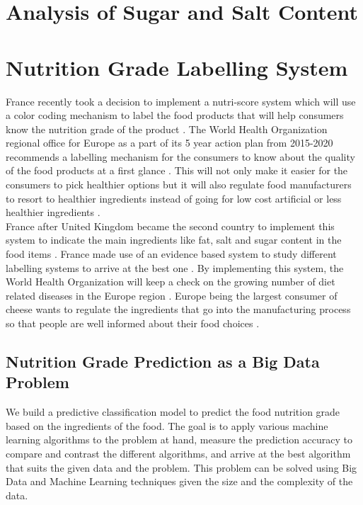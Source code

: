 \documentclass[sigconf]{acmart}
\begin{document}
\section{Analysis of Sugar and Salt Content}

\section{Nutrition Grade Labelling System}
France recently took a decision to implement a nutri-score system which will use a color coding mechanism to label the food products that will help consumers know the nutrition grade of the product \cite{www-who}. The World Health Organization regional office for Europe as a part of its 5 year action plan from 2015-2020 recommends a labelling mechanism for the consumers to know about the quality of the food products at a first glance \cite{www-who}. This will not only make it easier for the consumers to pick healthier options but it will also regulate food manufacturers to resort to healthier ingredients instead of going for low cost artificial or less healthier ingredients \cite{www-who}.  \\

France after United Kingdom became the second country to implement this system to indicate the main ingredients like fat, salt and sugar content in the food items \cite{www-who}. France made use of an evidence based system to study different labelling systems to arrive at the best one \cite{www-who}. By implementing this system, the World Health Organization will keep a check on the growing number of diet related diseases in the Europe region \cite{www-who}. Europe being the largest consumer of cheese wants to regulate the ingredients that go into the manufacturing process so that people are well informed about their food choices \cite{www-who}.

\subsection{Nutrition Grade Prediction as a Big Data Problem}
We build a predictive classification model to predict the food nutrition grade based on the ingredients of the food. The goal is to apply various machine learning algorithms to the problem at hand, measure the prediction accuracy to compare and contrast the different algorithms, and arrive at the best algorithm that suits the given data and the problem. This problem can be solved using Big Data and Machine Learning techniques given the size and the complexity of the data.
\end{document}
